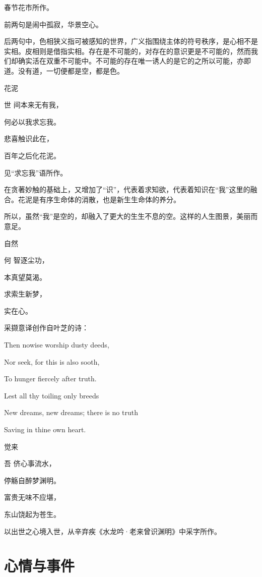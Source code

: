 \documentclass{article}
\newenvironment{poem}[3]{
\begin{minipage}{\textwidth}
\begin{pinyinscope}\begin{center}\Large\linespread{1.4}\selectfont #2\end{center}\end{pinyinscope}
\begin{pinyinscope}
	\begin{center}
	\Large\linespread{1.4}\rmfamily\selectfont #3
}{\end{center}
\end{pinyinscope}
\end{minipage}
}
\begin{document}
春节花市所作。

前两句是闹中孤寂，华景空心。

后两句中，色相狭义指可被感知的世界，广义指围绕主体的符号秩序，是心相不是实相。皮相则是借指实相。存在是不可能的，对存在的意识更是不可能的，然而我们却确实活在双重不可能中。不可能的存在唯一诱人的是它的之所以可能，亦即道。没有道，一切便都是空，都是色。

\begin{poem}{}{花泥}
世间本来无有我，

何必以我求忘我。

悲喜触识{}此在，

百年之后化花泥。
\end{poem}

见“求忘我”语所作。

在贪著妙触的基础上，又增加了“识”，代表着求知欲，代表着知识在“我”这里的融合。花泥是有序生命体的消散，也是新生生命体的养分。

所以，虽然“我”是空的，却融入了更大的生生不息的空。这样的人生图景，美丽而意足。

\begin{poem}{}{自然}
何智逐尘功，

本真望莫渴。

求索生新梦，

实{}在心{}。
\end{poem}

采撷意译创作自叶芝的诗：

\begin{displayquote}
Then nowise worship dusty deeds,

Nor seek, for this is also sooth,

To hunger fiercely after truth.

Lest all thy toiling only breeds

New dreams, new dreams; there is no truth

Saving in thine own heart.
\end{displayquote}

\begin{poem}{}{觉来}
吾侪心事{}流水，

停觞自醉梦渊明。

富贵无味不应堪，

东山饶起为苍生。
\end{poem}

以出世之心境入世，从辛弃疾《水龙吟·老来曾识渊明》中采字所作。

\section{心情与事件}
\end{document}
